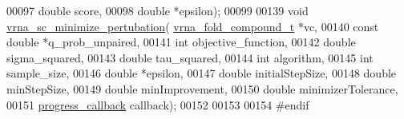 \begin{DoxyCode}
00097                                   \textcolor{keywordtype}{double}  score,
00098                                   \textcolor{keywordtype}{double}  *epsilon);
00099 
00139 \textcolor{keywordtype}{void} \hyperlink{group__perturbation_gaa124bdc20d88001c38ade590c4bcc3c4}{vrna\_sc\_minimize\_pertubation}(
      \hyperlink{group__fold__compound_structvrna__fc__s}{vrna\_fold\_compound\_t}  *vc,
00140                                   \textcolor{keyword}{const} \textcolor{keywordtype}{double}          *q\_prob\_unpaired,
00141                                   \textcolor{keywordtype}{int}                   objective\_function,
00142                                   \textcolor{keywordtype}{double}                sigma\_squared,
00143                                   \textcolor{keywordtype}{double}                tau\_squared,
00144                                   \textcolor{keywordtype}{int}                   algorithm,
00145                                   \textcolor{keywordtype}{int}                   sample\_size,
00146                                   \textcolor{keywordtype}{double}                *epsilon,
00147                                   \textcolor{keywordtype}{double}                initialStepSize,
00148                                   \textcolor{keywordtype}{double}                minStepSize,
00149                                   \textcolor{keywordtype}{double}                minImprovement,
00150                                   \textcolor{keywordtype}{double}                minimizerTolerance,
00151                                   \hyperlink{group__perturbation_gaa715397c7afd2d2955c315512a3d571a}{progress\_callback}     callback);
00152 
00153 
00154 \textcolor{preprocessor}{#endif}
\end{DoxyCode}
